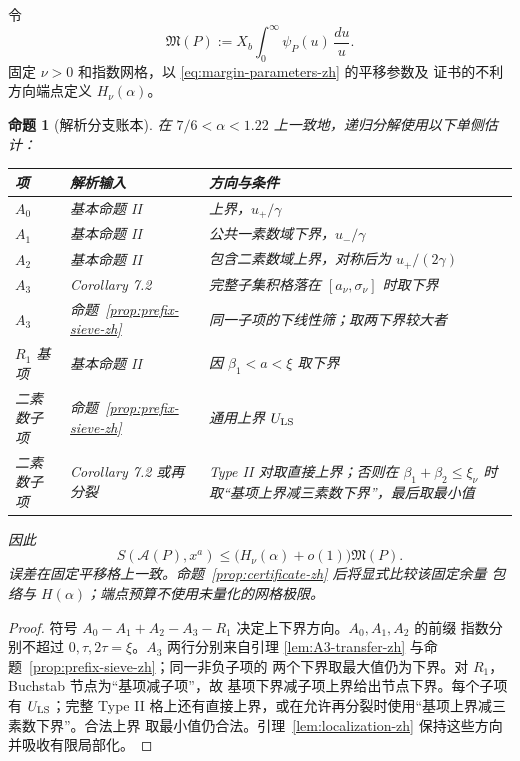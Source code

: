\documentclass[UTF8,10pt,a4paper]{ctexart}
\newcommand{\Acal}{\mathcal{A}}
\newcommand{\1}{\mathbf{1}}
\newtheorem{proposition}[theorem]{命题}
\theoremstyle{remark}
\begin{document}
令
\[
 \mathfrak M(P):=X_b\int_0^\infty\psi_P(u)\,\frac{du}{u}.
\]
固定 $\nu>0$ 和指数网格，以 \eqref{eq:margin-parameters-zh} 的平移参数及
证书的不利方向端点定义 $H_\nu(\alpha)$。

\begin{proposition}[解析分支账本]\label{prop:branch-ledger-zh}
在 $7/6<\alpha<1.22$ 上一致地，递归分解使用以下单侧估计：
\begin{center}
\small
\renewcommand{\arraystretch}{1.12}
\begin{tabular}{|p{}|p{}|p{}|}
\hline
项 & 解析输入 & 方向与条件\\
\hline
$A_0$ & 基本命题 II & 上界，$u_+/\gamma$\\
\hline
$A_1$ & 基本命题 II & 公共一素数域下界，$u_-/\gamma$\\
\hline
$A_2$ & 基本命题 II & 包含二素数域上界，对称后为 $u_+/(2\gamma)$\\
\hline
$A_3$ & Corollary 7.2 & 完整子集积格落在 $[a_\nu,\sigma_\nu]$ 时取下界\\
\hline
$A_3$ & 命题~\ref{prop:prefix-sieve-zh} & 同一子项的下线性筛；取两下界较大者\\
\hline
$R_1$ 基项 & 基本命题 II & 因 $\beta_1<a<\xi$ 取下界\\
\hline
二素数子项 & 命题~\ref{prop:prefix-sieve-zh} & 通用上界 $U_{\rm LS}$\\
\hline
二素数子项 & Corollary 7.2 或再分裂 & Type II 对取直接上界；否则在
$\beta_1+\beta_2\le\xi_\nu$ 时取“基项上界减三素数下界”，最后取最小值\\
\hline
\end{tabular}
\end{center}
因此
\[
 S(\Acal(P),x^a)
 \le \bigl(H_\nu(\alpha)+o(1)\bigr)\mathfrak M(P).
\]
误差在固定平移格上一致。命题~\ref{prop:certificate-zh} 后将显式比较该固定余量
包络与 $H(\alpha)$；端点预算不使用未量化的网格极限。
\end{proposition}

\begin{proof}
符号 $A_0-A_1+A_2-A_3-R_1$ 决定上下界方向。$A_0,A_1,A_2$ 的前缀
指数分别不超过 $0,\tau,2\tau=\xi$。$A_3$ 两行分别来自引理
\ref{lem:A3-transfer-zh} 与命题~\ref{prop:prefix-sieve-zh}；同一非负子项的
两个下界取最大值仍为下界。对 $R_1$，Buchstab 节点为“基项减子项”，故
基项下界减子项上界给出节点下界。每个子项有 $U_{\rm LS}$；完整 Type II
格上还有直接上界，或在允许再分裂时使用“基项上界减三素数下界”。合法上界
取最小值仍合法。引理~\ref{lem:localization-zh} 保持这些方向并吸收有限局部化。
\end{proof}
\end{document}
